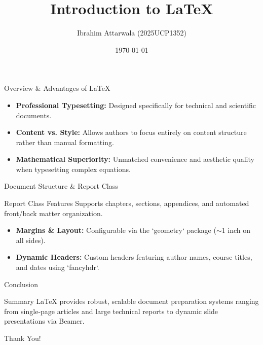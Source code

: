 \documentclass{beamer}
\title{Introduction to LaTeX}
\author{Ibrahim Attarwala (2025UCP1352)}
\date{\today}
\institute{Malaviya National Institute of Technology Jaipur}
\begin{document}
\begin{frame}
\maketitle
\end{frame}


\begin{frame}{Overview \& Advantages of LaTeX}
\begin{itemize}
    \item \textbf{Professional Typesetting:} Designed specifically for technical and scientific documents.
    \item \textbf{Content vs. Style:} Allows authors to focus entirely on content structure rather than manual formatting.
    \item \textbf{Mathematical Superiority:} Unmatched convenience and aesthetic quality when typesetting complex equations.
\end{itemize}
\end{frame}


\begin{frame}{Document Structure \& Report Class}
\begin{block}{Report Class Features}
Supports chapters, sections, appendices, and automated front/back matter organization.
\end{block}

\vspace{0.3cm}
\begin{itemize}
    \item \textbf{Margins \& Layout:} Configurable via the `geometry` package ($\sim$1 inch on all sides).
    \item \textbf{Dynamic Headers:} Custom headers featuring author names, course titles, and dates using `fancyhdr`.
\end{itemize}
\end{frame}


\begin{frame}{Conclusion}
\begin{alertblock}{Summary}
LaTeX provides robust, scalable document preparation systems ranging from single-page articles and large technical reports to dynamic slide presentations via Beamer.
\end{alertblock}

\vspace{0.5cm}
\centering
\Large{Thank You!}
\end{frame}
\end{document}
